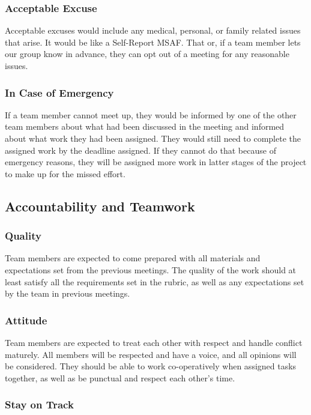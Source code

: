 \documentclass{article}
\begin{document}
\subsubsection*{Acceptable Excuse}

Acceptable excuses would include any medical, personal, or family related issues that arise. It would be like a Self-Report MSAF. That or, if a team member lets our group know in advance, they can opt out of a meeting for any reasonable issues.

\subsubsection*{In Case of Emergency}

If a team member cannot meet up, they would be informed by one of the other team members about what had been discussed in the meeting and informed about what work they had been assigned. They would still need to complete the assigned work by the deadline assigned. If they cannot do that because of emergency reasons, they will be assigned more work in latter stages of the project to make up for the missed effort. 

\subsection*{Accountability and Teamwork}

\subsubsection*{Quality} 

Team members are expected to come prepared with all materials and expectations set from the previous meetings. The quality of the work should at least satisfy all the requirements set in the rubric, as well as any expectations set by the team in previous meetings. 

\subsubsection*{Attitude}

Team members are expected to treat each other with respect and handle conflict maturely. All members will be respected and have a voice, and all opinions will be considered. They should be able to work co-operatively when assigned tasks together, as well as be punctual and respect each other’s time. 

\subsubsection*{Stay on Track}
\end{document}
